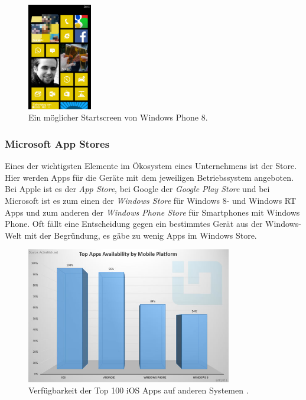 \documentclass[12pt,a4paper,bibtotoc,abstracton]{scrartcl}
\begin{document}
\begin{figure}[h]	
	\centering
	\includegraphics[width=0.25\textwidth]{Bilder/Screenshots/wp8/wp8_start.png} 
	\caption{Ein möglicher Startscreen von Windows Phone 8.}
	\label{fig:wp8}
\end{figure}  

\subsubsection{Microsoft App Stores}
\label{subsubsec:stores}
Eines der wichtigsten Elemente im Ökosystem eines Unternehmens ist der Store. Hier werden Apps für die Geräte mit dem jeweiligen Betriebssystem angeboten. Bei Apple ist es der \textit{App Store}, bei Google der \textit{Google Play Store} und bei Microsoft ist es  zum einen der \textit{Windows Store} für Windows 8- und Windows RT Apps und zum anderen der \textit{Windows Phone Store} für Smartphones mit Windows Phone. Oft fällt eine Entscheidung gegen ein bestimmtes Gerät aus der Windows-Welt mit der Begründung, es gäbe zu wenig Apps im Windows Store.

\begin{figure}[h]	
	\centering
	\includegraphics[width=0.8\textwidth]{Bilder/Abbildungen/store_chart.jpg} 
	\caption[Die Verfügbarkeit der Top 100 iOS Apps]{Verfügbarkeit der Top 100 iOS Apps auf anderen Systemen \citep{WinbetaStore2013}.}
	\label{fig:storechart}
\end{figure}  
\end{document}
